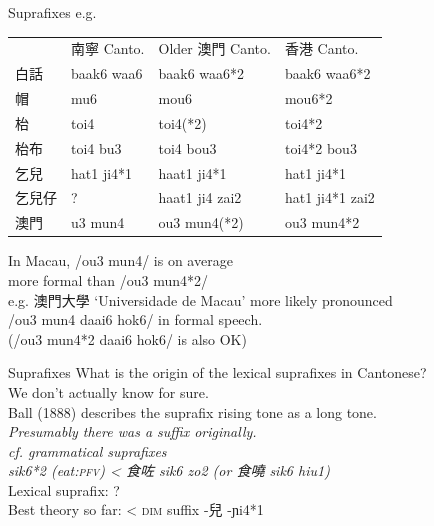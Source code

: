 \documentclass{beamer}
\begin{document}
\begin{frame}[fragile]{Suprafixes}
e.g.\\
\begin{table}
\flushleft
\begin{tabular}{l l l l}
     & 南寧 Canto. & Older 澳門 Canto. & 香港 Canto.\\
    白話 & baak6 waa6 & baak6 waa6*2 & baak6 waa6*2\\
    帽 & mu6 & mou6 & mou6*2\\
    枱 & toi4 & toi4(*2) & toi4*2\\
    枱布 & toi4 bu3 & toi4 bou3 & toi4*2 bou3\\
    乞兒 & hat1 ji4*1 & haat1 ji4*1 & hat1 ji4*1\\
    乞兒仔 & ? & haat1 ji4 zai2 & hat1 ji4*1 zai2\\
    澳門 & u3 mun4 & ou3 mun4(*2) & ou3 mun4*2\\
\end{tabular}
\end{table}
\medskip
{\small In Macau, /ou3 mun4/ is on average\\ \quad more formal than /ou3 mun4*2/\\
e.g. 澳門大學 \enquote*{Universidade de Macau} more likely pronounced\\ /ou3 mun4 daai6 hok6/ in formal speech.\\ (/ou3 mun4*2 daai6 hok6/ is also OK)}

\end{frame}

\begin{frame}[fragile]{Suprafixes}
What is the origin of the lexical suprafixes in Cantonese?\\
\medskip
{\scriptsize We don't actually know for sure.}\\
\medskip
Ball (1888) describes the suprafix rising tone as a long tone.\\
\bigskip
\emph{Presumably there was a suffix originally.}\\
\medskip
\emph{cf. grammatical suprafixes\\
sik6*2 (eat:\textsc{pfv}) < 食咗 sik6 zo2 (or 食嘵 sik6 hiu1)}\\
\medskip
Lexical suprafix: ?\\
\medskip
Best theory so far: < \textsc{dim} suffix -兒 -ɲi4*1 
\end{frame}
\end{document}
